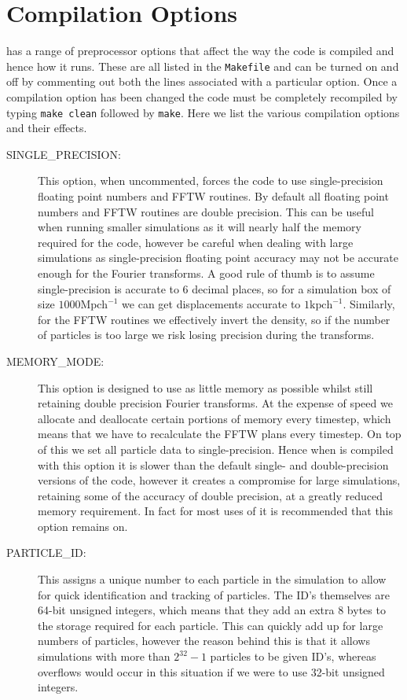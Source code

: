 \documentclass[12pt,twoside,a4paper]{article}
\begin{document}
\section{Compilation Options}
{\PICOLA} has a range of preprocessor options that affect the way the code is compiled and hence how it runs. These are all listed in the \texttt{Makefile} and can be turned on and off by commenting out both the lines associated with a particular option. Once a compilation option has been changed the code must be completely recompiled by typing \texttt{make clean} followed by \texttt{make}. Here we list the various compilation options and their effects.
\begin{description}
  \item[SINGLE\_PRECISION:]{This option, when uncommented, forces the code to use single-precision floating point numbers and FFTW routines. By default all floating point numbers and FFTW routines are double precision. This can be useful when running smaller simulations as it will nearly half the memory required for the code, however be careful when dealing with large simulations as single-precision floating point accuracy may not be accurate enough for the Fourier transforms. A good rule of thumb is to assume single-precision is accurate to 6 decimal places, so for a simulation box of size $1000\text{Mpch}^{-1}$ we can get displacements accurate to $1\text{kpch}^{-1}$. Similarly, for the FFTW routines we effectively invert the density, so if the number of particles is too large we risk losing precision during the transforms.}
  \item[MEMORY\_MODE:]{This option is designed to use as little memory as possible whilst still retaining double precision Fourier transforms. At the expense of speed we allocate and deallocate certain portions of memory every timestep, which means that we have to recalculate the FFTW plans every timestep. On top of this we set all particle data to single-precision. Hence when {\PICOLA} is compiled with this option it is slower than the default single- and double-precision versions of the code, however it creates a compromise for large simulations, retaining some of the accuracy of double precision, at a greatly reduced memory requirement. In fact for most uses of {\PICOLA} it is recommended that this option remains on.}
  \item[PARTICLE\_ID:]{This assigns a unique number to each particle in the simulation to allow for quick identification and tracking of particles. The ID's themselves are 64-bit unsigned integers, which means that they add an extra 8 bytes to the storage required for each particle. This can quickly add up for large numbers of particles, however the reason behind this is that it allows simulations with more than $2^{32}-1$ particles to be given ID's, whereas overflows would occur in this situation if we were to use 32-bit unsigned integers.}

\end{description}
\end{document}
